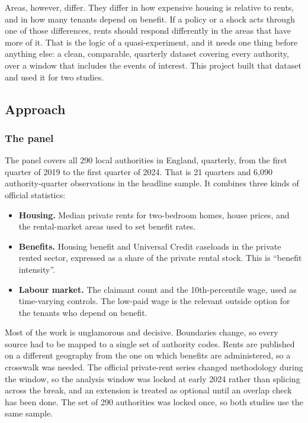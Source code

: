 \documentclass[
  british,
  a4paper,
]{article}
\providecommand{\tightlist}{%
  \setlength{\itemsep}{0pt}\setlength{\parskip}{0pt}}
\begin{document}
Areas, however, differ. They differ in how expensive housing is relative
to rents, and in how many tenants depend on benefit. If a policy or a
shock acts through one of those differences, rents should respond
differently in the areas that have more of it. That is the logic of a
quasi-experiment, and it needs one thing before anything else: a clean,
comparable, quarterly dataset covering every authority, over a window
that includes the events of interest. This project built that dataset
and used it for two studies.

\subsection{Approach}\label{approach}

\subsubsection{The panel}\label{the-panel}

The panel covers all 290 local authorities in England, quarterly, from
the first quarter of 2019 to the first quarter of 2024. That is 21
quarters and 6,090 authority-quarter observations in the headline
sample. It combines three kinds of official statistics:

\begin{itemize}
\tightlist
\item
  \textbf{Housing.} Median private rents for two-bedroom homes, house
  prices, and the rental-market areas used to set benefit rates.
\item
  \textbf{Benefits.} Housing benefit and Universal Credit caseloads in
  the private rented sector, expressed as a share of the private rental
  stock. This is ``benefit intensity''.
\item
  \textbf{Labour market.} The claimant count and the 10th-percentile
  wage, used as time-varying controls. The low-paid wage is the relevant
  outside option for the tenants who depend on benefit.
\end{itemize}

Most of the work is unglamorous and decisive. Boundaries change, so
every source had to be mapped to a single set of authority codes. Rents
are published on a different geography from the one on which benefits
are administered, so a crosswalk was needed. The official private-rent
series changed methodology during the window, so the analysis window was
locked at early 2024 rather than splicing across the break, and an
extension is treated as optional until an overlap check has been done.
The set of 290 authorities was locked once, so both studies use the same
sample.
\end{document}

